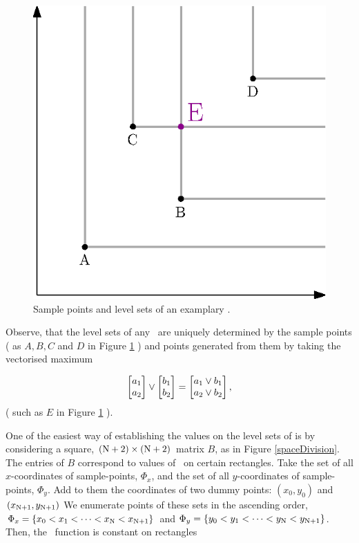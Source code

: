 \begin{figure}
	\centering \includegraphics[scale=1]{./img/KS1.eps}
	\caption{Sample points and level sets of an examplary \ecdf.}\label{simpleEcdf}
\end{figure}


Observe, that the level sets of any \ecdf\, are uniquely determined by the sample points ( as $A, B, C$ and $D$ in Figure \ref{simpleEcdf} ) and points generated from them by taking the vectorised maximum

$$ 
	\begin{bmatrix} a_1 \cr a_2 \end{bmatrix} \vee 
	\begin{bmatrix} b_1 \cr b_2 \end{bmatrix} = 
	\begin{bmatrix} a_1 \vee b_1 \cr a_2 \vee b_2 \end{bmatrix},
$$ 
( such as $E$ in Figure \ref{simpleEcdf} ).  

One of the easiest way of establishing the values on the level sets of \Fecdf  is by considering a square, $(\mathrm{N}+2)\times(\mathrm{N}+2)$ matrix $B$, as in Figure \ref{spaceDivision}. The entries of $B$ correspond to values of \Fecdf\, on certain rectangles. Take the set of all $x$-coordinates of sample-points, $\Phi_x$, and the set of all $y$-coordinates of sample-points, $\Phi_y$. Add to them the coordinates of two dummy points: $(x_0, y_0)$ and $(x_{\mathrm{N}+1}, y_{\mathrm{N}+1})$ We enumerate points of these sets in the ascending order, $\Phi_x = \{ x_0 < x_1 < \dots <x_{\mathrm{N}} < x_{\mathrm{N}+1} \}$ and $\Phi_y = \{ y_0 < y_1 < \dots <y_{\mathrm{N}} < y_{\mathrm{N}+1} \}$. Then, the \Fecdf\, function is constant on rectangles 

